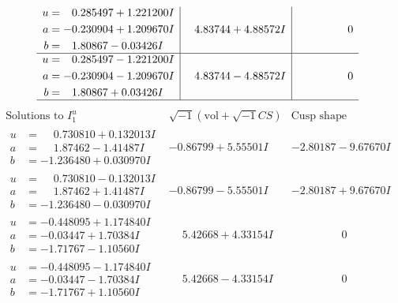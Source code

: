 \documentclass[1p]{elsarticle_modified}
\theoremstyle{definition}
\newcommand{\I}{\sqrt{-1}}
\begin{document}
$$\begin{array}{c|c|c}
\begin{aligned}
u &= \phantom{-}0.285497 + 1.221200 I \\
a &= -0.230904 + 1.209670 I \\
b &= \phantom{-}1.80867 - 0.03426 I\end{aligned}
 & \phantom{-}4.83744 + 4.88572 I & \phantom{-0.000000 } 0 \\ \hline\begin{aligned}
u &= \phantom{-}0.285497 - 1.221200 I \\
a &= -0.230904 - 1.209670 I \\
b &= \phantom{-}1.80867 + 0.03426 I\end{aligned}
 & \phantom{-}4.83744 - 4.88572 I & \phantom{-0.000000 } 0\\
 \hline 
 \end{array}$$\newpage$$\begin{array}{c|c|c}  
\text{Solutions to }I^u_{1}& \I (\text{vol} + \sqrt{-1}CS) & \text{Cusp shape}\\
 \hline 
\begin{aligned}
u &= \phantom{-}0.730810 + 0.132013 I \\
a &= \phantom{-}1.87462 - 1.41487 I \\
b &= -1.236480 + 0.030970 I\end{aligned}
 & -0.86799 + 5.55501 I & -2.80187 - 9.67670 I \\ \hline\begin{aligned}
u &= \phantom{-}0.730810 - 0.132013 I \\
a &= \phantom{-}1.87462 + 1.41487 I \\
b &= -1.236480 - 0.030970 I\end{aligned}
 & -0.86799 - 5.55501 I & -2.80187 + 9.67670 I \\ \hline\begin{aligned}
u &= -0.448095 + 1.174840 I \\
a &= -0.03447 + 1.70384 I \\
b &= -1.71767 - 1.10560 I\end{aligned}
 & \phantom{-}5.42668 + 4.33154 I & \phantom{-0.000000 } 0 \\ \hline\begin{aligned}
u &= -0.448095 - 1.174840 I \\
a &= -0.03447 - 1.70384 I \\
b &= -1.71767 + 1.10560 I\end{aligned}
 & \phantom{-}5.42668 - 4.33154 I & \phantom{-0.000000 } 0 \\ \hline\begin{aligned}

\end{aligned}
\end{array}$$
\end{document}
